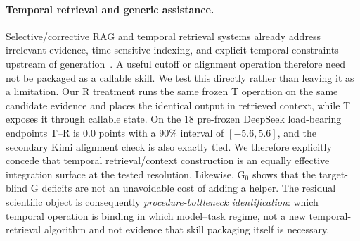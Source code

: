 \paragraph{Temporal retrieval and generic assistance.}
Selective/corrective RAG and temporal retrieval systems already address irrelevant evidence, time-sensitive indexing, and explicit temporal constraints upstream of generation~\citep{asai2024selfrag,yan2024crag,zhang2025mrag,abdallah2026tempretriever,han2025temporalgraphs,wang2026iarag,liu2026chronos}. A useful cutoff or alignment operation therefore need not be packaged as a callable skill. We test this directly rather than leaving it as a limitation. Our R treatment runs the same frozen T operation on the same candidate evidence and places the identical output in retrieved context, while T exposes it through callable state. On the 18 pre-frozen DeepSeek load-bearing endpoints T--R is 0.0 points with a 90\% interval of $[-5.6,5.6]$, and the secondary Kimi alignment check is also exactly tied. We therefore explicitly concede that temporal retrieval/context construction is an equally effective integration surface at the tested resolution. Likewise, G$_0$ shows that the target-blind G deficits are not an unavoidable cost of adding a helper. The residual scientific object is consequently \emph{procedure-bottleneck identification}: which temporal operation is binding in which model--task regime, not a new temporal-retrieval algorithm and not evidence that skill packaging itself is necessary.
